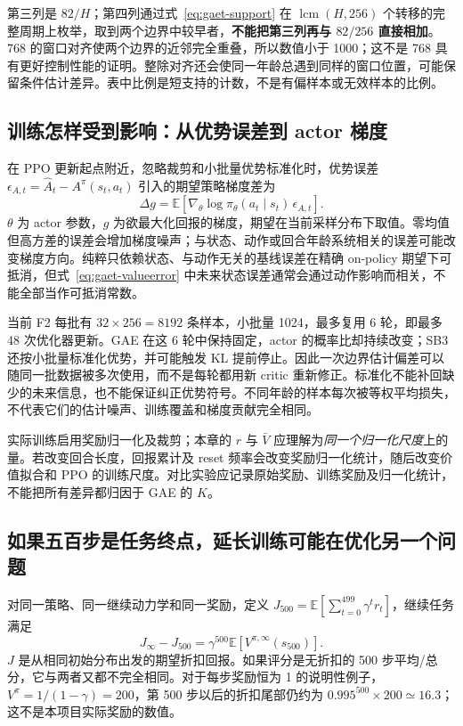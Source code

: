 \documentclass[12pt,fontset=none]{ctexart}
\numberwithin{equation}{section}
\numberwithin{table}{section}
\numberwithin{figure}{section}
\begin{document}
第三列是 $82/H$；第四列通过式~\eqref{eq:gaet-support} 在 $\operatorname{lcm}(H,256)$ 个转移的完整周期上枚举，取到两个边界中较早者，\textbf{不能把第三列再与 $82/256$ 直接相加}。768 的窗口对齐使两个边界的近邻完全重叠，所以数值小于 1000；这不是 768 具有更好控制性能的证明。整除对齐还会使同一年龄总遇到同样的窗口位置，可能保留条件估计差异。表中比例是短支持的计数，不是有偏样本或无效样本的比例。

\subsection{训练怎样受到影响：从优势误差到 actor 梯度}

在 PPO 更新起点附近，忽略裁剪和小批量优势标准化时，优势误差 $\epsilon_{A,t}=\hat A_t-A^\pi(s_t,a_t)$ 引入的期望策略梯度差为
\begin{equation}\label{eq:gaet-gradienterror}
 \Delta g=\mathbb E\!\left[
 \nabla_\theta\log\pi_\theta(a_t\mid s_t)\,\epsilon_{A,t}
 \right].
\end{equation}
$\theta$ 为 actor 参数，$g$ 为欲最大化回报的梯度，期望在当前采样分布下取值。零均值但高方差的误差会增加梯度噪声；与状态、动作或回合年龄系统相关的误差可能改变梯度方向。纯粹只依赖状态、与动作无关的基线误差在精确 on-policy 期望下可抵消，但式~\eqref{eq:gaet-valueerror} 中未来状态误差通常会通过动作影响而相关，不能全部当作可抵消常数。

当前 F2 每批有 $32\times256=8192$ 条样本，小批量 1024，最多复用 6 轮，即最多 48 次优化器更新。GAE 在这 6 轮中保持固定，actor 的概率比却持续改变；SB3 还按小批量标准化优势，并可能触发 KL 提前停止。因此一次边界估计偏差可以随同一批数据被多次使用，而不是每轮都用新 critic 重新修正。标准化不能补回缺少的未来信息，也不能保证纠正优势符号。不同年龄的样本每次被等权平均损失，不代表它们的估计噪声、训练覆盖和梯度贡献完全相同。

实际训练启用奖励归一化及裁剪；本章的 $r$ 与 $\bar V$ 应理解为\emph{同一个归一化尺度}上的量。若改变回合长度，回报累计及 reset 频率会改变奖励归一化统计，随后改变价值拟合和 PPO 的训练尺度。对比实验应记录原始奖励、训练奖励及归一化统计，不能把所有差异都归因于 GAE 的 $K$。

\subsection{如果五百步是任务终点，延长训练可能在优化另一个问题}

对同一策略、同一继续动力学和同一奖励，定义 $J_{500}=\mathbb E[\sum_{t=0}^{499}\gamma^t r_t]$，继续任务满足
\begin{equation}\label{eq:gaet-objectivegap}
 J_\infty-J_{500}
 =\gamma^{500}\mathbb E[V^{\pi,\infty}(s_{500})].
\end{equation}
$J$ 是从相同初始分布出发的期望折扣回报。如果评分是无折扣的 500 步平均/总分，它与两者又都不完全相同。对于每步奖励恒为 1 的说明性例子，$V^\pi=1/(1-\gamma)=200$，第 500 步以后的折扣尾部仍约为 $0.995^{500}\times200\simeq16.3$；这不是本项目实际奖励的数值。
\end{document}
